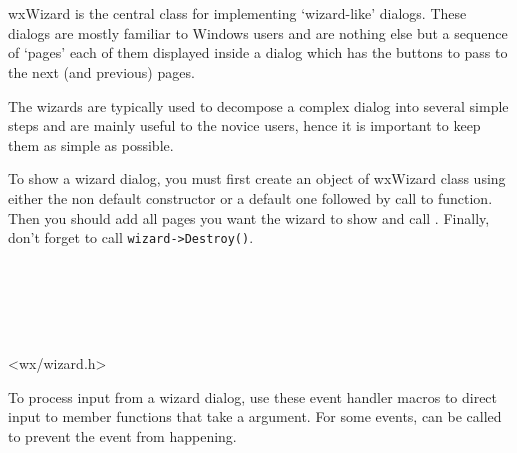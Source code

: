 
\section{}\label{wxwizard}

wxWizard is the central class for implementing `wizard-like' dialogs. These
dialogs are mostly familiar to Windows users and are nothing else but a
sequence of `pages' each of them displayed inside a dialog which has the
buttons to pass to the next (and previous) pages.

The wizards are typically used to decompose a complex dialog into several
simple steps and are mainly useful to the novice users, hence it is important
to keep them as simple as possible.

To show a wizard dialog, you must first create an object of wxWizard class
using either the non default constructor or a default one followed by call to 
 function. Then you should add all pages you
want the wizard to show and call .
Finally, don't forget to call {\tt wizard->Destroy()}.


\\
\\
\\
\\


<wx/wizard.h>


To process input from a wizard dialog, use these event handler macros to
direct input to member functions that take a 
 argument. For some events, 
 can be called to prevent the event from
happening.

\twocolwidtha{7cm}
\begin{twocollist}\itemsep=2pt
\end{twocollist}%

